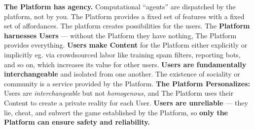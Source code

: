 \textbf{The Platform has agency.} Computational ``agents'' are
dispatched by the platform, not by you. The Platform provides a fixed
set of features with a fixed set of affordances. The platform creates
possibilities for the users. The \textbf{Platform harnesses
Users} --- without the Platform
they have nothing, The Platform provides everything. \textbf{Users make
Content} for the Platform either explicitly or implicitly eg. via
crowdsourced labor like training spam filters, reporting bots, and so
on, which increases its value for other users. \textbf{Users are
fundamentally interchangeable} and isolated from one another. The
existence of sociality or community is a service provided by the
Platform. \textbf{The Platform Personalizes:} Users are
\emph{interchangeable} but not \emph{homogenous,} and The Platform uses
their Content to create a private reality for each User. \textbf{Users
are unreliable} --- they lie, cheat, and subvert the game established by
the Platform, so \textbf{only the Platform can ensure safety and
reliability.}

